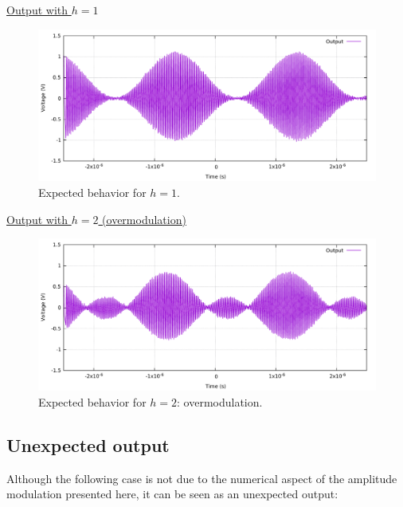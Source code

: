 \documentclass[12pt,oneside]{article}
\begin{document}
\underline{Output with $h=1$}

\begin{figure}[!h!tb]
	\begin{center}
		\includegraphics[width=14cm]{scope/Mod_amplOkV1h10.pdf}
		\caption{Expected behavior for $h=1$.}
		\label{fig:ampleModV12}
	\end{center}
\end{figure}
\newpage
\underline{Output with $h=2$ (overmodulation)}

\begin{figure}[!h!tb]
	\begin{center}
		\includegraphics[width=14cm]{scope/Mod_amplOkV1h20.pdf}
		\caption{Expected behavior for $h=2$: overmodulation.}
		\label{fig:ampleModV13}
	\end{center}
\end{figure}

\subsection{Unexpected output}

Although the following case is not due to the numerical aspect of the amplitude modulation presented here, it can be seen as an unexpected output:
\end{document}
